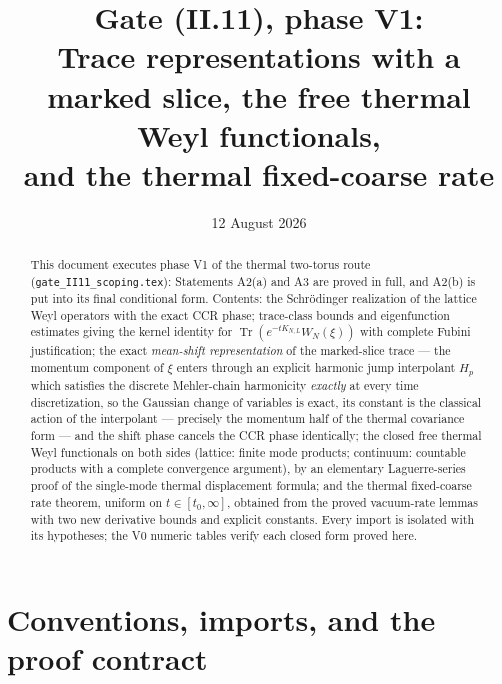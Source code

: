 \documentclass[11pt,a4paper]{article}
\title{Gate (II.11), phase V1:\\[4pt]
\large Trace representations with a marked slice, the free thermal Weyl
functionals,\\ and the thermal fixed-coarse rate}
\author{}
\date{12 August 2026}
\theoremstyle{plain}
\theoremstyle{definition}
\DeclareMathOperator{\Trace}{Tr}
\begin{document}
\maketitle

\begin{abstract}
This document executes phase V1 of the thermal two-torus route
(\texttt{gate\_II11\_}\allowbreak\texttt{scoping.tex}): Statements A2(a) and A3 are proved in full,
and A2(b) is put into its final conditional form. Contents: the Schr\"odinger
realization of the lattice Weyl operators with the exact CCR phase; trace-class
bounds and eigenfunction estimates giving the kernel identity for
$\Trace(e^{-tK_{N,L}}W_N(\xi))$ with complete Fubini justification; the exact
\emph{mean-shift representation} of the marked-slice trace --- the momentum
component of $\xi$ enters through an explicit harmonic jump interpolant $H_p$
which satisfies the discrete Mehler-chain harmonicity \emph{exactly} at every
time discretization, so the Gaussian change of variables is exact, its constant
is the classical action of the interpolant --- precisely the momentum half of
the thermal covariance form --- and the shift phase cancels the CCR phase
identically; the closed free thermal Weyl functionals on both sides
(lattice: finite mode products; continuum: countable products with a complete
convergence argument), by an elementary Laguerre-series proof of the
single-mode thermal displacement formula; and the thermal fixed-coarse rate
theorem, uniform on $t\in[t_0,\infty]$, obtained from the proved vacuum-rate
lemmas with two new derivative bounds and explicit constants. Every import is
isolated with its hypotheses; the V0 numeric tables verify each closed form
proved here.
\end{abstract}

\tableofcontents

\section{Conventions, imports, and the proof contract}\label{sec:conv}
\end{document}
